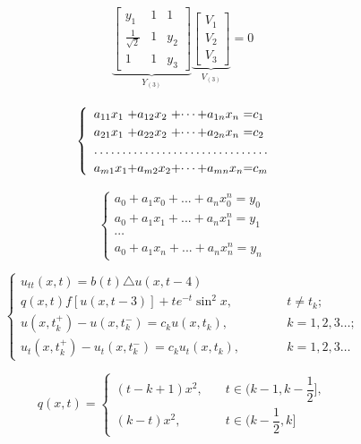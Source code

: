 \documentclass{book}
\begin{document}
\begin{gather}
	\underbrace{
	\begin{bmatrix}
	y_{1} & 1 & 1 \\[20pt]
	\frac{1}{\sqrt{2}} & 1 & y_{2} \\[20pt]
	1 & 1 &  y_{3} 
	\end{bmatrix}
	}_{Y_(3)}
	\underbrace{
	\begin{bmatrix}
	V_1 \\[20pt]
	V_2 \\[20pt]
	V_3 
	\end{bmatrix}
	}_{V_(3)}=0
\end{gather}

\begin{equation}
	\begin{cases}
		\begin{array}{*{3} {l@{+}} l @{=} l}
		a_{11}x_{1} & a_{12}x_{2} & \cdots & a_{1n}x_{n} & c_{1}\\
		a_{21}x_{1} & a_{22}x_{2} & \cdots & a_{2n}x_{n} & c_{2}\\
		\hdotsfor{5}\\
		a_{m1}x_{1} & a_{m2}x_{2} & \cdots & a_{mn}x_{n} & c_{m}\\		
		\end{array}
	\end{cases}
\end{equation}

\begin{equation}  
	\left\{
	\begin{array}{rrrl}
	a_{0}+a_{1}x_{0}+...+a_{n}x_{0}^{n}=y_{0} \\
	a_{0}+a_{1}x_{1}+...+a_{n}x_{1}^{n}=y_{1} \\
	\cdots\\
	a_{0}+a_{1}x_{n}+...+a_{n}x_{n}^{n}=y_{n}
	\end{array}
	\right.
\end{equation}


\[
	\begin{cases}
		u_{tt}(x,t)= b(t)\triangle u(x,t-4)   \\
		q(x,t)f[u(x,t-3)]+te^{-t}\sin^2x,    				\hspace{42pt}& t\neq t_k; \\
		u(x,t_k^+) - u(x,t_k^-) = c_k u(x,t_k),				 & k=1,2,3\ldots ;\\
		u_{t}(x,t_k^+) - u_{t}(x,t_k^-) =c_k u_{t}(x,t_k), 	&k=1,2,3\ldots
	\end{cases}
\]

\[ 
	q(x,t)= 
	\begin{cases}
	(t-k+1)x^2,\quad  	& t\in \big( k-1,k-\dfrac{1}{2} \big],\\ 
	(k-t)x^2, \quad 	& t\in \big( k-\dfrac{1}{2},k \big]
	\end{cases} 
\] 
\end{document}
